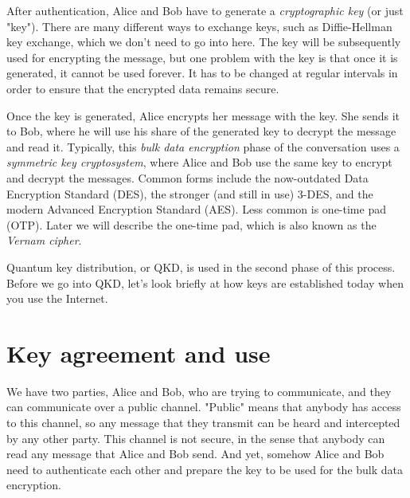 After authentication, Alice and Bob have to generate a \emph{cryptographic key} (or just "key"). There are many different ways to exchange keys, such as Diffie-Hellman key exchange, which we don't need to go into here. The key will be subsequently used for encrypting the message, but one problem with the key is that once it is generated, it cannot be used forever. It has to be changed at regular intervals in order to ensure that the encrypted data remains secure.

Once the key is generated, Alice encrypts her message with the key. She sends it to Bob, where he will use his share of the generated key to decrypt the message and read it.  Typically, this \emph{bulk data encryption} phase of the conversation uses a \emph{symmetric key cryptosystem}, where Alice and Bob use the same key to encrypt and decrypt the messages. Common forms include the now-outdated Data Encryption Standard (DES), the stronger (and still in use) 3-DES, and the modern Advanced Encryption Standard (AES). Less common is one-time pad (OTP). Later we will describe the one-time pad, which is also known as the \emph{Vernam cipher}.

Quantum key distribution, or QKD, is used in the second phase of this process.  Before we go into QKD, let's look briefly at how keys are established today when you use the Internet.

\section{Key agreement and use}

We have two parties, Alice and Bob, who are trying to communicate, and they can communicate over a public channel. "Public" means that anybody has access to this channel, so any message that they transmit can be heard and intercepted by any other party. This channel is not secure, in the sense that anybody can read any message that Alice and Bob send. And yet, somehow Alice and Bob need to authenticate each other and prepare the key to be used for the bulk data encryption.

